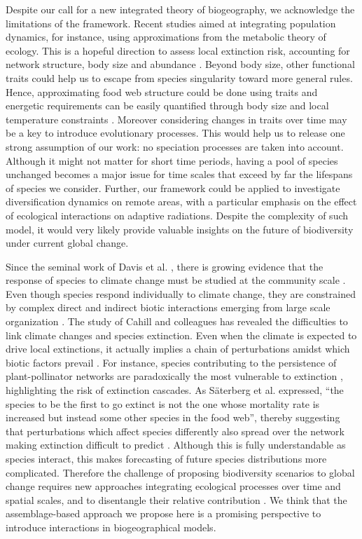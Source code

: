 Despite our call for a new integrated theory of biogeography, we acknowledge the limitations of the framework. Recent studies aimed at integrating population dynamics, for instance, using approximations from the metabolic theory of ecology. This is a hopeful direction to assess local extinction risk, accounting for network structure, body size and abundance \citep{Schneider2012}. Beyond body size, other functional traits \citep{McGill2006} could help us to escape from species singularity toward more general rules. Hence, approximating food web structure could be done using traits \citep{Gravel2013} and energetic requirements can be easily quantified through body size and local temperature constraints \citep{Brown2004}. Moreover considering changes in traits over time may be a key to introduce evolutionary processes. This would help us to release one strong assumption of our work: no speciation processes are taken into account. Although it might not matter for short time periods, having a pool of species unchanged becomes a major issue for time scales that exceed by far the lifespans of species we consider. Further, our framework could be applied to investigate diversification dynamics on remote areas, with a particular emphasis on the effect of ecological interactions on adaptive radiations. Despite the complexity of such model, it would very likely provide valuable insights on the future of biodiversity under current global change.

Since the seminal work of Davis et al. \citep{Davis1998}, there is growing evidence that the response of species to climate change must be studied at the community scale \citep{Suttle2007}. Even though species respond individually to climate change, they are constrained by complex direct and indirect biotic interactions emerging from large scale organization \citep{Lavergne2010}. The study of Cahill and colleagues \citep{Cahill2013} has revealed the difficulties to link climate changes and species extinction. Even when the climate is expected to drive local extinctions, it actually implies a chain of perturbations amidst which biotic factors prevail \citep[\textit{e.g.} loss of prey,][]{Durance2010}. For instance, species contributing to the persistence of plant-pollinator networks are paradoxically the most vulnerable to extinction \citep{Saavedra2011}, highlighting the risk of extinction cascades. As S\"aterberg et al. expressed, ``the species to be the first to go extinct is not the one whose mortality rate is increased but instead some other species in the food web'', thereby suggesting that perturbations which affect species differently also spread over the network making extinction difficult to predict \citep{Saterberg2013}. Although this is fully understandable as species interact, this makes forecasting of future species distributions more complicated. Therefore the challenge of proposing biodiversity scenarios to global change requires new approaches integrating ecological processes over time and spatial scales, and to disentangle their relative contribution \citep{Lavergne2010}. We think that the assemblage-based approach we propose here is a promising perspective to introduce interactions in biogeographical models.


